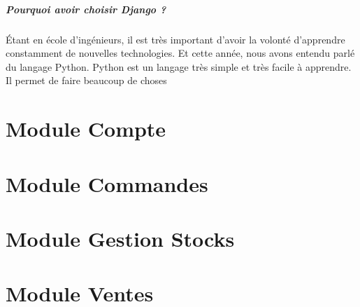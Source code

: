 \documentclass[twoside,UTF8]{EPURapport}
\begin{document}
\paragraph{Pourquoi avoir choisir Django ?} Étant en école d'ingénieurs, il est très important d'avoir la volonté d'apprendre constamment de nouvelles technologies. Et cette année, nous avons entendu parlé du langage Python. Python est un langage très simple et très facile à apprendre. Il permet de faire beaucoup de choses 
\chapter{Module Compte}

\chapter{Module Commandes}

\chapter{Module Gestion Stocks}

\chapter{Module Ventes}
\end{document}
